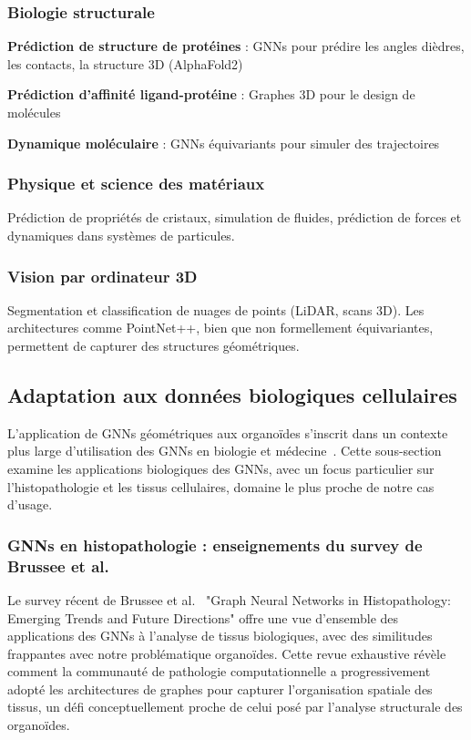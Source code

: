 \subsubsection{Biologie structurale}

\textbf{Prédiction de structure de protéines} : GNNs pour prédire les angles dièdres, les contacts, la structure 3D (AlphaFold2)

\textbf{Prédiction d'affinité ligand-protéine} : Graphes 3D pour le design de molécules

\textbf{Dynamique moléculaire} : GNNs équivariants pour simuler des trajectoires

\subsubsection{Physique et science des matériaux}

Prédiction de propriétés de cristaux, simulation de fluides, prédiction de forces et dynamiques dans systèmes de particules.

\subsubsection{Vision par ordinateur 3D}

Segmentation et classification de nuages de points (LiDAR, scans 3D). Les architectures comme PointNet++, bien que non formellement équivariantes, permettent de capturer des structures géométriques.

\subsection{Adaptation aux données biologiques cellulaires}

L'application de GNNs géométriques aux organoïdes s'inscrit dans un contexte plus large d'utilisation des GNNs en biologie et médecine~\cite{Zhang2021GNN,Lecca2023}. Cette sous-section examine les applications biologiques des GNNs, avec un focus particulier sur l'histopathologie et les tissus cellulaires, domaine le plus proche de notre cas d'usage.

\subsubsection{GNNs en histopathologie : enseignements du survey de Brussee et al.}

Le survey récent de Brussee et al.~\cite{Brussee2024} "Graph Neural Networks in Histopathology: Emerging Trends and Future Directions" offre une vue d'ensemble des applications des GNNs à l'analyse de tissus biologiques, avec des similitudes frappantes avec notre problématique organoïdes. Cette revue exhaustive révèle comment la communauté de pathologie computationnelle a progressivement adopté les architectures de graphes pour capturer l'organisation spatiale des tissus, un défi conceptuellement proche de celui posé par l'analyse structurale des organoïdes.

